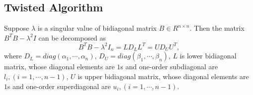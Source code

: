 \vspace{-0.1in}
\subsection{Twisted Algorithm}
\vspace{-0.1in}

Suppose $\lambda$ is a singular value of bidiagonal matrix $B \in R^{n \times n}$.
Then the matrix $B^T B - \lambda^2 I$ can be decomposed as
\begin{equation}
B^T B - \lambda^2 I_n = L D_L L^T = U D_U U^T ,
\end{equation}
where $D_L=diag(\alpha_1, \cdots, \alpha_n)$, $D_U = diag(\beta_1, \cdots, \beta_n)$, 
$L$ is lower bidiagonal matrix, whose diagonal elements are $1$s and one-order subdiagonal are $l_{i}, (i=1,\cdots,n-1)$, 
$U$ is upper bidiagonal matrix, whose diagonal elements are $1$s and one-order superdiagonal are $u_{i}, (i=1,\cdots,n-1)$. 

